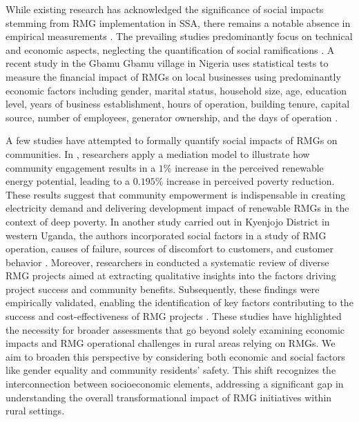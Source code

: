 While existing research has acknowledged the significance of social impacts stemming from RMG implementation in SSA, there remains a notable absence in empirical measurements \cite{eales2018social}. The prevailing studies predominantly focus on technical and economic aspects, neglecting the quantification of social ramifications \cite{pueyo2018impact, wassie2021socio, uwineza2021analysis, lee2020experimental}. A recent study in the Gbamu Gbamu village in Nigeria uses statistical tests to measure the financial impact of RMGs on local businesses using predominantly economic factors including gender, marital status, household size, age, education level, years of business establishment, hours of operation, building tenure, capital source, number of employees, generator ownership, and the days of operation \cite{babalola2022socio}. 

A few studies have attempted to formally quantify social impacts of RMGs on communities. In \cite{liu2021enabling}, researchers apply a mediation model to illustrate how community engagement results in a $1\%$ increase in the perceived renewable energy potential, leading to a $0.195\%$ increase in perceived poverty reduction. These results suggest that community empowerment is indispensable in creating electricity demand and delivering development impact of renewable RMGs in the context of deep poverty. In another study carried out in Kyenjojo District in western Uganda, the authors incorporated social factors in a study of RMG  operation, causes of failure, sources of discomfort to customers, and customer behavior \cite{cartland2022socio}. Moreover, researchers in \cite{duran2021analysis} conducted a systematic review of diverse RMG projects aimed at extracting qualitative insights into the factors driving project success and community benefits. Subsequently, these findings were empirically validated, enabling the identification of key factors contributing to the success and cost-effectiveness of RMG projects \cite{nyarko2023drivers}. These studies have highlighted the necessity for broader assessments that go beyond solely examining economic impacts and RMG operational challenges in rural areas relying on RMGs. We aim to broaden this perspective by considering both economic and social factors like gender equality and community residents' safety. This shift recognizes the interconnection between socioeconomic elements, addressing a significant gap in understanding the overall transformational impact of RMG initiatives within rural settings.

